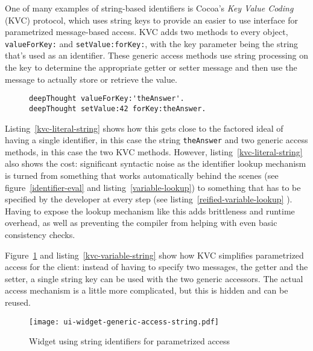 \documentclass[preprint,authoryear]{llncs}
\begin{document}
One of many examples of string-based identifiers is Cocoa's \emph{Key Value Coding} (KVC)\cite{KVC} protocol,
which uses string keys to provide
an easier to use interface for parametrized message-based access.  
KVC adds two methods to every object, {\tt valueForKey:} and {\tt setValue:forKey:},
with the key parameter being the string that's used as an identifier.  These generic access methods 
use string processing on the key to determine the appropriate getter or setter message and 
then use the message to actually store or retrieve the value.  

\begin{figure}[htbp]
\begin{lstlisting}[style=numbers,label=kvc-literal-string,caption=Strings used with \emph{Key Value Coding} (KVC).]
deepThought valueForKey:'theAnswer'.
deepThought setValue:42 forKey:theAnswer.
\end{lstlisting}
\end{figure}

Listing~\ref{kvc-literal-string} shows how this gets close to the factored ideal of having a single identifier,
in this case the string {\tt theAnswer} and two generic access methods, in this case the two KVC methods.
However, listing~\ref{kvc-literal-string} also shows the cost:  significant syntactic noise as the identifier
lookup mechanism is turned from something that works automatically behind the scenes (see figure~\ref{identifier-eval}
and listing~\ref{variable-lookup}) to something that has to be specified by the developer at every step (see 
listing~\ref{reified-variable-lookup} ).   Having to expose the lookup mechanism like this adds brittleness and
runtime overhead, as well as preventing the compiler from helping with even basic consistency checks.


Figure~\ref{ui-widget-string-access} and listing~\ref{kvc-variable-string} show how KVC simplifies parametrized access for 
the client:  instead of having to specify two messages, the getter and the setter, a single string key can be used with
the two generic accessors.  The actual access mechanism is a little more complicated, but this is hidden and can 
be reused.

\begin{figure}[htbp]
\begin{center}
\texttt{[image: ui-widget-generic-access-string.pdf]}
\caption{Widget using string identifiers for parametrized access}
\label{ui-widget-string-access}
\end{center}
\end{figure}
\end{document}
